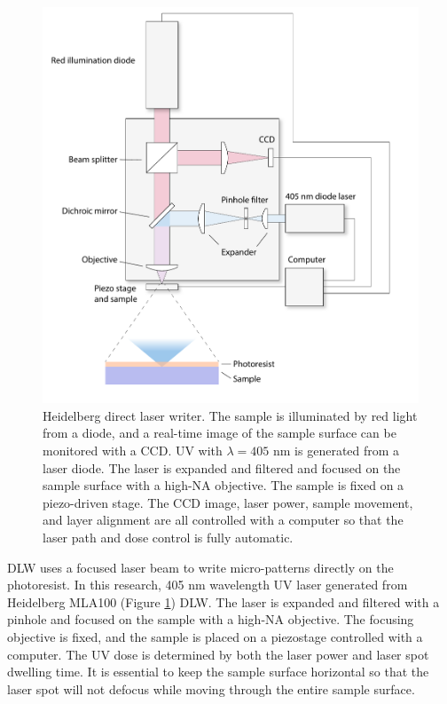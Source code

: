 \documentclass[pdflatex, sectionletters, 12pt]{pittetd}    %
\begin{document}
\begin{figure}[hp]
	\centering
	\includegraphics[width=1.0\textwidth]{Drawing/Heidelberg.pdf}
	\caption{Heidelberg direct laser writer. The sample is illuminated by red light from a diode, and a real-time image of the sample surface can be monitored with a CCD. UV with $\lambda=405$ nm is generated from a laser diode. The laser is expanded and filtered and focused on the sample surface with a high-NA objective. The sample is fixed on a piezo-driven stage. The CCD image, laser power, sample movement, and layer alignment are all controlled with a computer so that the laser path and dose control is fully automatic.}
	\label{FIG:Heidelberg}
\end{figure}

DLW uses a focused laser beam to write micro-patterns directly on the photoresist. In this research, 405 nm wavelength UV laser generated from Heidelberg MLA100 (Figure \ref{FIG:Heidelberg}) DLW. The laser is expanded and filtered with a pinhole and focused on the sample with a high-NA objective. The focusing objective is fixed, and the sample is placed on a piezostage controlled with a computer. The UV dose is determined by both the laser power and laser spot dwelling time. It is essential to keep the sample surface horizontal so that the laser spot will not defocus while moving through the entire sample surface. 
\end{document}
